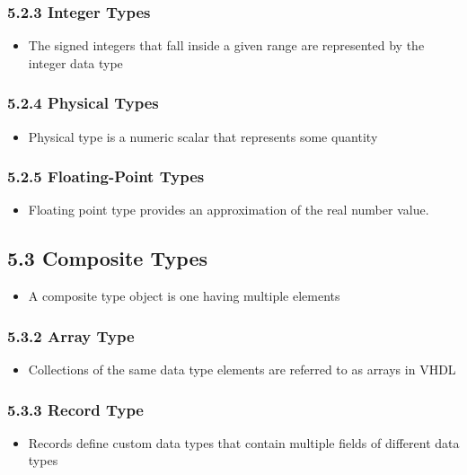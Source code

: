 \documentclass[a4paper,12pt]{article}
\begin{document}
	\subsubsection*{5.2.3 Integer Types}
	\begin{itemize}
		\item The signed integers that fall inside a given range are represented by the integer data type
	\end{itemize}
	
	\subsubsection*{5.2.4 Physical Types}
	\begin{itemize}
		\item Physical type is a numeric scalar that represents some quantity
	\end{itemize}
	
	\subsubsection*{5.2.5 Floating-Point Types}
	\begin{itemize}
		\item Floating point type provides an approximation of the real number value.
	\end{itemize}
	
	\subsection*{5.3 Composite Types}
	\begin{itemize}
		\item A composite type object is one having multiple elements
	\end{itemize}
	
	\subsubsection*{5.3.2 Array Type}
	\begin{itemize}
		\item Collections of the same data type elements are referred to as arrays in VHDL
	\end{itemize}
	
	\subsubsection*{5.3.3 Record Type}
	\begin{itemize}
		\item Records define custom data types that contain multiple fields of different data types
	\end{itemize}
	
\end{document}
